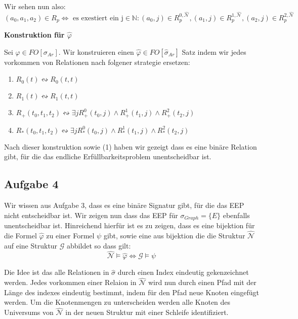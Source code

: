 \documentclass[12pt]{article}
\begin{document}
Wir sehen nun also:
\[ (a_0,a_1,a_2)\in R_p \Leftrightarrow \text{ es exestiert ein j}\in\mathbb N: (a_0,j)\in R_p^{0,\hat{\mathcal{N}}},(a_1,j)\in R_p^{1,\hat{\mathcal{N}}},(a_2,j)\in R_p^{2,\hat{\mathcal{N}}} \]

\textbf{Konstruktion für $\hat\varphi$}

Sei $\varphi\in FO[\sigma_{Ar}]$. Wir konstruieren einen $\hat\varphi\in FO[\hat\sigma_{Ar}]$ Satz indem wir jedes vorkommen von Relationen nach folgener strategie ersetzen:

\begin{enumerate}
  \item $R_{0}(t) \leftrightsquigarrow R_{0}(t,t)$
  \item $R_{1}(t) \leftrightsquigarrow R_{1}(t,t)$
  \item $R_{+}(t_0, t_1, t_2) \leftrightsquigarrow \exists j R_+^0(t_0, j)\land R_+^1(t_1, j)\land R_+^2(t_2, j)$
  \item $R_{*}(t_0, t_1, t_2) \leftrightsquigarrow \exists j R_*^0(t_0, j)\land R_*^1(t_1, j)\land R_*^2(t_2, j)$
\end{enumerate}

Nach dieser konstruktion sowie (1) haben wir gezeigt dass es eine binäre Relation gibt, für  die das endliche Erfüllbarkeitsproblem unentscheidbar ist.


\subsection*{Aufgabe 4}

Wir wissen aus Aufgabe 3, dass es eine binäre Signatur gibt, für die das EEP
nicht entscheidbar ist. Wir zeigen nun dass das EEP für $\sigma_{Graph} = \{E\}$
ebenfalls unentscheidbar ist. Hinreichend hierfür ist es zu zeigen, dass es eine
bijektion für die Formel $\hat\varphi$ zu einer Formel $\psi$ gibt, sowie eine
aus bijektion die die Struktur $\hat{\mathcal{N}}$ auf eine Struktur
$\mathcal{G}$ abbildet so dass gilt:
\begin{equation}
  \label{pf4}
  \hat{\mathcal{N}}\models\hat\varphi \Leftrightarrow \mathcal{G}\models\psi
\end{equation}

Die Idee ist das alle Relationen in $\hat\sigma$ durch einen Index eindeutig
gekenzeichnet werden. Jedes vorkommen einer Relaion in $\hat{\mathcal{N}}$
wird nun durch einen Pfad mit der Länge des indexes eindeutig bestimmt, indem
für den Pfad neue Knoten eingefügt werden. Um die Knotenmengen zu unterscheiden
werden alle Knoten des Universums von $\hat{\mathcal{N}}$ in der neuen Struktur
mit einer Schleife identifiziert.
\end{document}
